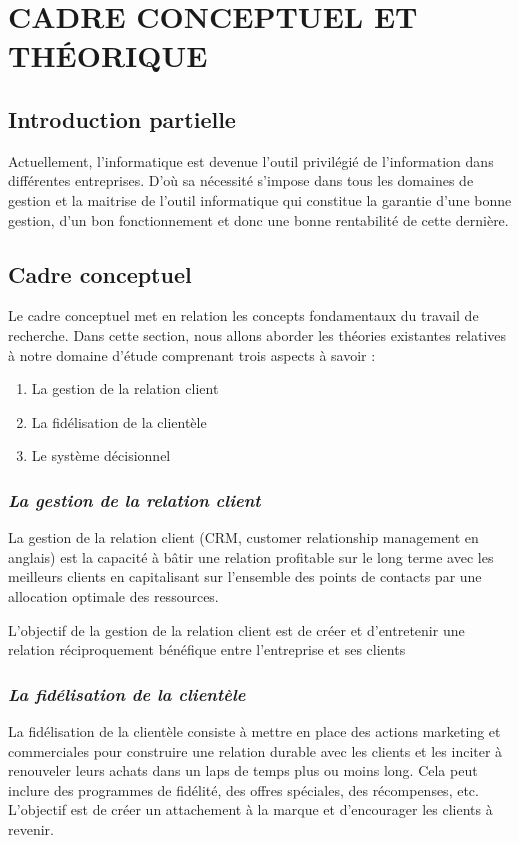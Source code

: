 \chapter[CADRE CONCEPTUEL ET THÉORIQUE]{\centering CADRE CONCEPTUEL ET THÉORIQUE}    
    \section{Introduction partielle}
    Actuellement, l’informatique est devenue l’outil privilégié de l’information dans
    différentes entreprises. D’où sa nécessité s’impose dans tous les domaines de gestion et la
    maitrise de l’outil informatique qui constitue la garantie d’une bonne gestion, d’un bon
    fonctionnement et donc une bonne rentabilité de cette dernière.
    \section[Cadre Conceptuel]{Cadre conceptuel}
    Le cadre conceptuel met en relation les concepts fondamentaux du travail de
    recherche. Dans cette section, nous allons aborder les théories existantes relatives à notre
    domaine d’étude comprenant trois aspects à savoir : 
    \newline
        \begin{enumerate}
            \item La gestion de la relation client
            \item La fidélisation de la clientèle
            \item Le système décisionnel
        \end{enumerate} 
        \subsection[La gestion de la relation client]{\textit{La gestion de la relation client}}
        La gestion de la relation client (CRM, customer relationship management en anglais) est
        la capacité à bâtir une relation profitable sur le long terme avec les meilleurs clients
        en capitalisant sur l’ensemble des points de contacts par une allocation optimale
        des ressources. \cite*{Lefebure2005}
        \newline
        
        L’objectif de la gestion de la relation client est de créer et d’entretenir
        une relation réciproquement bénéfique entre l’entreprise et ses clients
        \subsection[La fidélisation de la clientèle]{\textit{La fidélisation de la clientèle}}
        La fidélisation de la clientèle consiste à mettre en place des actions marketing et commerciales
        pour construire une relation durable avec les clients et les inciter à renouveler
        leurs achats dans un laps de temps plus ou moins long. \cite*{Maud2022}
        Cela peut inclure des programmes de fidélité, des offres spéciales, des récompenses, etc.
        L’objectif est de créer un attachement à la marque et d’encourager les clients à revenir.
        \newline

